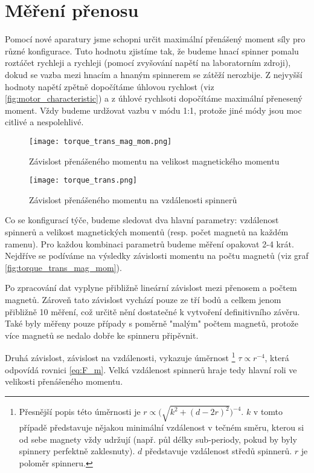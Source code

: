 \clearpage

\section{Měření přenosu}

Pomocí nové aparatury jsme schopni určit maximální přenášený moment síly pro různé konfigurace. Tuto hodnotu zjistíme tak, že budeme hnací spinner pomalu roztáčet rychleji a rychleji (pomocí zvyšování napětí na laboratorním zdroji), dokud se vazba mezi hnacím a hnaným spinnerem se zátěží nerozbije. Z nejvyšší hodnoty napětí zpětně dopočítáme úhlovou rychlost (viz \autoref{fig:motor_characteristic}) a z úhlové rychlsoti dopočítáme maximální přenesený moment. Vždy budeme urdžovat vazbu v módu 1:1, protože jiné módy jsou moc citlivé a nespolehlivé.

\begin{wrapfigure}{r}{0.5\textwidth}
    \vspace{-1cm}
    \texttt{[image: torque\_trans\_mag\_mom.png]}
    \centering
    \caption{Závislost přenášeného momentu na velikost magnetického momentu}
    \label{fig:torque_trans_mag_mom}

    \vspace{1cm}
    \texttt{[image: torque\_trans.png]}
    \centering
    \caption{Závislost přenášeného momentu na vzdálenosti spinnerů}
    \label{fig:torque_trans}
\end{wrapfigure}

Co se konfigurací týče, budeme sledovat dva hlavní parametry: vzdálenost spinnerů a velikost magnetických momentů (resp. počet magnetů na každém ramenu). Pro každou kombinaci parametrů budeme měření opakovat 2-4 krát. Nejdříve se podíváme na výsledky závislosti momentu na počtu magnetů (viz graf \ref{fig:torque_trans_mag_mom}).

Po zpracování dat vyplyne přibližně lineární závislost mezi přenosem a počtem magnetů. Zároveň tato závislost vychází pouze ze tří bodů a celkem jenom přibližně 10 měření, což určitě nění dostatečné k vytvoření definitivního závěru. Také byly měřeny pouze případy s poměrně "malým" počtem magnetů, protože více magnetů se nedalo dobře ke spinneru připěvnit.

Druhá závislost, závislost na vzdálenosti, vykazuje úměrnost \footnote{Přesnější popis této úměrnosti je $r \propto \big( \sqrt{k^2+(d-2r)^2} \big)^{-4}$. $k$ v tomto případě představuje nějakou minimální vzdálenost v tečném směru, kterou si od sebe magnety vždy udržují (např. půl délky sub-periody, pokud by byly spinnery perfektně zaklesnuty). $d$ představuje vzdálenost středů spinnerů. $r$ je poloměr spinneru. } $\tau \propto r^{-4}$, která odpovídá rovnici \ref{eq:F_m}. Velká vzdálenost spinnerů hraje tedy hlavní roli ve velikosti přenášeného momentu.

\clearpage
